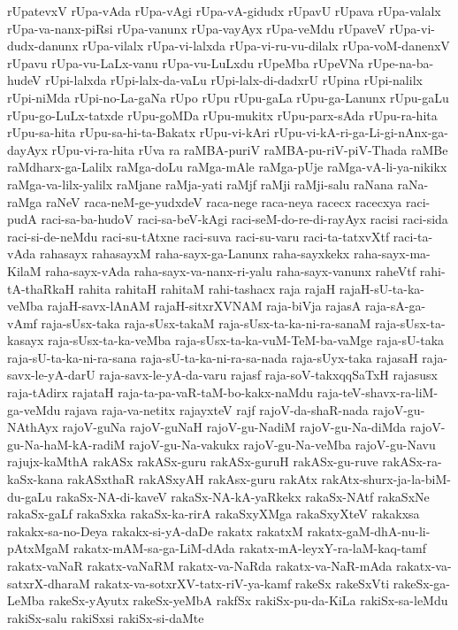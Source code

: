{rUpatevxV
rUpa-vAda
rUpa-vAgi
rUpa-vA-gidudx
rUpavU
rUpava
rUpa-valalx
rUpa-va-nanx-piRsi
rUpa-vanunx
rUpa-vayAyx
rUpa-veMdu
rUpaveV
rUpa-vi-dudx-danunx
rUpa-vilalx
rUpa-vi-lalxda
rUpa-vi-ru-vu-dilalx
rUpa-voM-danenxV
rUpavu
rUpa-vu-LaLx-vanu
rUpa-vu-LuLxdu
rUpeMba
rUpeVNa
rUpe-na-ba-hudeV
rUpi-lalxda
rUpi-lalx-da-vaLu
rUpi-lalx-di-dadxrU
rUpina
rUpi-nalilx
rUpi-niMda
rUpi-no-La-gaNa
rUpo
rUpu
rUpu-gaLa
rUpu-ga-Lanunx
rUpu-gaLu
rUpu-go-LuLx-tatxde
rUpu-goMDa
rUpu-mukitx
rUpu-parx-sAda
rUpu-ra-hita
rUpu-sa-hita
rUpu-sa-hi-ta-Bakatx
rUpu-vi-kAri
rUpu-vi-kA-ri-ga-Li-gi-nAnx-ga-dayAyx
rUpu-vi-ra-hita
rUva
ra
raMBA-puriV
raMBA-pu-riV-piV-Thada
raMBe
raMdharx-ga-Lalilx
raMga-doLu
raMga-mAle
raMga-pUje
raMga-vA-li-ya-nikikx
raMga-va-lilx-yalilx
raMjane
raMja-yati
raMjf
raMji
raMji-salu
raNana
raNa-raMga
raNeV
raca-neM-ge-yudxdeV
raca-nege
raca-neya
racecx
racecxya
raci-pudA
raci-sa-ba-hudoV
raci-sa-beV-kAgi
raci-seM-do-re-di-rayAyx
racisi
raci-sida
raci-si-de-neMdu
raci-su-tAtxne
raci-suva
raci-su-varu
raci-ta-tatxvXtf
raci-ta-vAda
rahasayx
rahasayxM
raha-sayx-ga-Lanunx
raha-sayxkekx
raha-sayx-ma-KilaM
raha-sayx-vAda
raha-sayx-va-nanx-ri-yalu
raha-sayx-vanunx
raheVtf
rahi-tA-thaRkaH
rahita
rahitaH
rahitaM
rahi-tashacx
raja
rajaH
rajaH-sU-ta-ka-veMba
rajaH-savx-lAnAM
rajaH-sitxrXVNAM
raja-biVja
rajasA
raja-sA-ga-vAmf
raja-sUsx-taka
raja-sUsx-takaM
raja-sUsx-ta-ka-ni-ra-sanaM
raja-sUsx-ta-kasayx
raja-sUsx-ta-ka-veMba
raja-sUsx-ta-ka-vuM-TeM-ba-vaMge
raja-sU-taka
raja-sU-ta-ka-ni-ra-sana
raja-sU-ta-ka-ni-ra-sa-nada
raja-sUyx-taka
rajasaH
raja-savx-le-yA-darU
raja-savx-le-yA-da-varu
rajasf
raja-soV-takxqqSaTxH
rajasusx
raja-tAdirx
rajataH
raja-ta-pa-vaR-taM-bo-kakx-naMdu
raja-teV-shavx-ra-liM-ga-veMdu
rajava
raja-va-netitx
rajayxteV
rajf
rajoV-da-shaR-nada
rajoV-gu-NAthAyx
rajoV-guNa
rajoV-guNaH
rajoV-gu-NadiM
rajoV-gu-Na-diMda
rajoV-gu-Na-haM-kA-radiM
rajoV-gu-Na-vakukx
rajoV-gu-Na-veMba
rajoV-gu-Navu
rajujx-kaMthA
rakASx
rakASx-guru
rakASx-guruH
rakASx-gu-ruve
rakASx-ra-kaSx-kana
rakASxthaR
rakASxyAH
rakAsx-guru
rakAtx
rakAtx-shurx-ja-la-biM-du-gaLu
rakaSx-NA-di-kaveV
rakaSx-NA-kA-yaRkekx
rakaSx-NAtf
rakaSxNe
rakaSx-gaLf
rakaSxka
rakaSx-ka-rirA
rakaSxyXMga
rakaSxyXteV
rakakxsa
rakakx-sa-no-Deya
rakakx-si-yA-daDe
rakatx
rakatxM
rakatx-gaM-dhA-nu-li-pAtxMgaM
rakatx-mAM-sa-ga-LiM-dAda
rakatx-mA-leyxY-ra-laM-kaq-tamf
rakatx-vaNaR
rakatx-vaNaRM
rakatx-va-NaRda
rakatx-va-NaR-mAda
rakatx-va-satxrX-dharaM
rakatx-va-sotxrXV-tatx-riV-ya-kamf
rakeSx
rakeSxVti
rakeSx-ga-LeMba
rakeSx-yAyutx
rakeSx-yeMbA
rakfSx
rakiSx-pu-da-KiLa
rakiSx-sa-leMdu
rakiSx-salu
rakiSxsi
rakiSx-si-daMte
}
